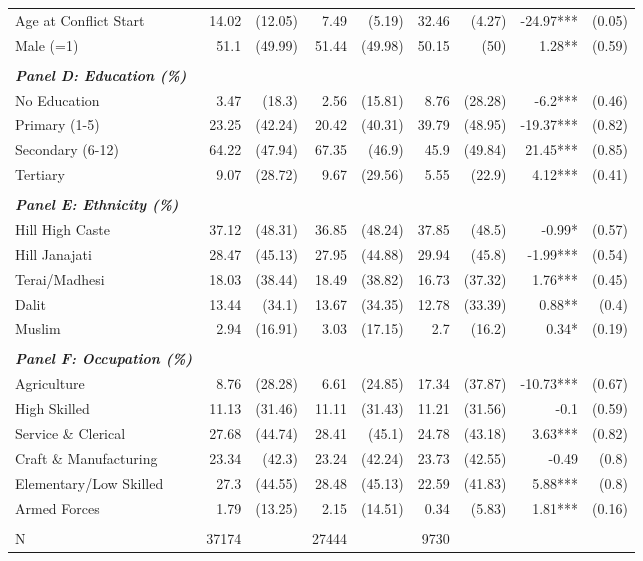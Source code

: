 \begin{landscape}
\begin{table}[!h]
{\begin{tabular}[t]{lrrrrrrrr}
Age at Conflict Start & 14.02 & (12.05) & 7.49 & (5.19) & 32.46 & (4.27) & -24.97*** & (0.05)\\
\addlinespace
Male (=1) & 51.1 & (49.99) & 51.44 & (49.98) & 50.15 & (50) & 1.28** & (0.59)\\
 &  &  &  &  &  &  &  & \\
\em{\textbf{Panel D: Education (\%)}} & \em{\textbf{}} & \em{\textbf{}} & \em{\textbf{}} & \em{\textbf{}} & \em{\textbf{}} & \em{\textbf{}} & \em{\textbf{}} & \em{\textbf{}}\\
No Education & 3.47 & (18.3) & 2.56 & (15.81) & 8.76 & (28.28) & -6.2*** & (0.46)\\
Primary (1-5) & 23.25 & (42.24) & 20.42 & (40.31) & 39.79 & (48.95) & -19.37*** & (0.82)\\
\addlinespace
Secondary (6-12) & 64.22 & (47.94) & 67.35 & (46.9) & 45.9 & (49.84) & 21.45*** & (0.85)\\
Tertiary & 9.07 & (28.72) & 9.67 & (29.56) & 5.55 & (22.9) & 4.12*** & (0.41)\\
 &  &  &  &  &  &  &  & \\
\em{\textbf{Panel E: Ethnicity (\%)}} & \em{\textbf{}} & \em{\textbf{}} & \em{\textbf{}} & \em{\textbf{}} & \em{\textbf{}} & \em{\textbf{}} & \em{\textbf{}} & \em{\textbf{}}\\
Hill High Caste & 37.12 & (48.31) & 36.85 & (48.24) & 37.85 & (48.5) & -0.99* & (0.57)\\
\addlinespace
Hill Janajati & 28.47 & (45.13) & 27.95 & (44.88) & 29.94 & (45.8) & -1.99*** & (0.54)\\
Terai/Madhesi & 18.03 & (38.44) & 18.49 & (38.82) & 16.73 & (37.32) & 1.76*** & (0.45)\\
Dalit & 13.44 & (34.1) & 13.67 & (34.35) & 12.78 & (33.39) & 0.88** & (0.4)\\
Muslim & 2.94 & (16.91) & 3.03 & (17.15) & 2.7 & (16.2) & 0.34* & (0.19)\\
 &  &  &  &  &  &  &  & \\
\addlinespace
\em{\textbf{Panel F: Occupation (\%)}} & \em{\textbf{}} & \em{\textbf{}} & \em{\textbf{}} & \em{\textbf{}} & \em{\textbf{}} & \em{\textbf{}} & \em{\textbf{}} & \em{\textbf{}}\\
Agriculture & 8.76 & (28.28) & 6.61 & (24.85) & 17.34 & (37.87) & -10.73*** & (0.67)\\
High Skilled & 11.13 & (31.46) & 11.11 & (31.43) & 11.21 & (31.56) & -0.1 & (0.59)\\
Service \& Clerical & 27.68 & (44.74) & 28.41 & (45.1) & 24.78 & (43.18) & 3.63*** & (0.82)\\
Craft \& Manufacturing & 23.34 & (42.3) & 23.24 & (42.24) & 23.73 & (42.55) & -0.49 & (0.8)\\
\addlinespace
Elementary/Low Skilled & 27.3 & (44.55) & 28.48 & (45.13) & 22.59 & (41.83) & 5.88*** & (0.8)\\
Armed Forces & 1.79 & (13.25) & 2.15 & (14.51) & 0.34 & (5.83) & 1.81*** & (0.16)\\
 &  &  &  &  &  &  &  & \\
N & 37174 &  & 27444 &  & 9730 &  &  & \\
\bottomrule


\end{tabular}}
\end{table}
\end{landscape}

